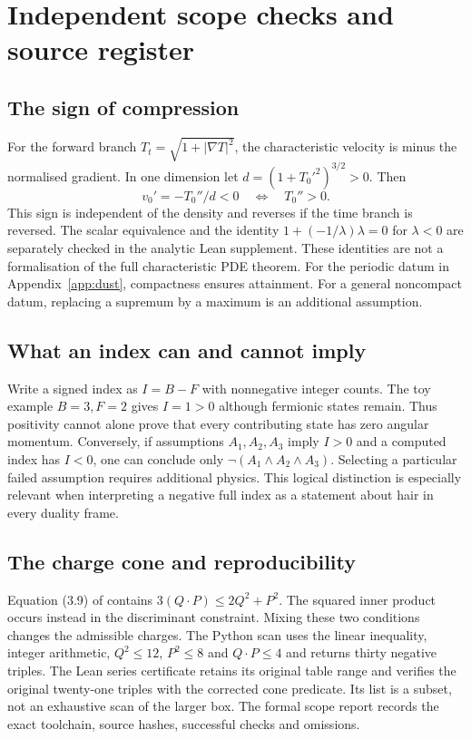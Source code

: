 \section{Independent scope checks and source register}\label{app:scopechecks}

\subsection{The sign of compression}
For the forward branch $T_t=\sqrt{1+|\nabla T|^2}$, the characteristic velocity is minus the normalised gradient. In one dimension let $d=(1+T_0'^2)^{3/2}>0$. Then
\[
v_0'=-T_0''/d<0\quad\Longleftrightarrow\quad T_0''>0.
\]
This sign is independent of the density and reverses if the time branch is reversed. The scalar equivalence and the identity $1+(-1/\lambda)\lambda=0$ for $\lambda<0$ are separately checked in the analytic Lean supplement. These identities are not a formalisation of the full characteristic PDE theorem. For the periodic datum in Appendix~\ref{app:dust}, compactness ensures attainment. For a general noncompact datum, replacing a supremum by a maximum is an additional assumption.

\subsection{What an index can and cannot imply}
Write a signed index as $I=B-F$ with nonnegative integer counts. The toy example $B=3,F=2$ gives $I=1>0$ although fermionic states remain. Thus positivity cannot alone prove that every contributing state has zero angular momentum. Conversely, if assumptions $A_1,A_2,A_3$ imply $I>0$ and a computed index has $I<0$, one can conclude only $\neg(A_1\land A_2\land A_3)$. Selecting a particular failed assumption requires additional physics. This logical distinction is especially relevant when interpreting a negative full index as a statement about hair in every duality frame.

\subsection{The charge cone and reproducibility}
Equation (3.9) of \cite{Sen11positivity} contains $3(Q\cdot P)\le2Q^2+P^2$. The squared inner product occurs instead in the discriminant constraint. Mixing these two conditions changes the admissible charges. The Python scan uses the linear inequality, integer arithmetic, $Q^2\le12$, $P^2\le8$ and $Q\cdot P\le4$ and returns thirty negative triples. The Lean series certificate retains its original table range and verifies the original twenty-one triples with the corrected cone predicate. Its list is a subset, not an exhaustive scan of the larger box. The formal scope report records the exact toolchain, source hashes, successful checks and omissions.

